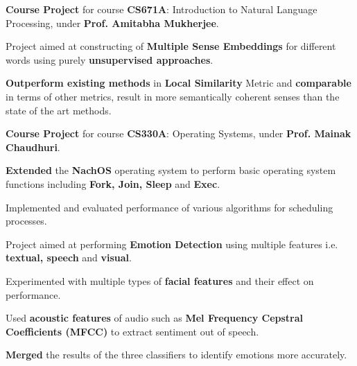 \documentclass[a4paper]{norm-resume}
\begin{document}
	\vspace{2mm}

						
	\begin{tightitemize}
	\small
	{
	\item \textbf{Course Project} for course \textbf{CS671A}: Introduction to Natural Language Processing, under \textbf{Prof. Amitabha Mukherjee}.
	\item Project aimed at constructing of \textbf{Multiple Sense Embeddings} for different words using purely \textbf{unsupervised approaches}.
	\item \textbf{Outperform existing methods} in \textbf{Local Similarity} Metric and \textbf{comparable} in terms of other metrics, result in more semantically coherent senses than the state of the art methods.
	}
	\end{tightitemize}
		
	\vspace{2mm}

	   \descript{July '15 - Nov '15}
	\begin{tightitemize}
	\small
	{
	\item \textbf{Course Project} for course \textbf{CS330A}: Operating Systems, under \textbf{Prof. Mainak Chaudhuri}.
	\item \textbf{Extended} the \textbf{NachOS} operating system to perform basic operating system functions including \textbf{Fork, Join, Sleep} and \textbf{Exec}. 
	\item Implemented and evaluated performance of various algorithms for scheduling processes.
	}
	\end{tightitemize}
		
	\vspace{2mm}
	
	   \descript{May '14 - Jun '14}
	\begin{tightitemize}
	\small
	{
	\item Project aimed at performing \textbf{Emotion Detection} using multiple features i.e. \textbf{textual, speech} and \textbf{visual}.
	\item Experimented with multiple types of \textbf{facial features} and their effect on performance.
	\item Used \textbf{acoustic features} of audio such as \textbf{Mel Frequency Cepstral Coefficients (MFCC)} to extract sentiment out of speech.
	\item \textbf{Merged} the results of the three classifiers to identify emotions more accurately.
	}
	\end{tightitemize}
		
\end{document}
